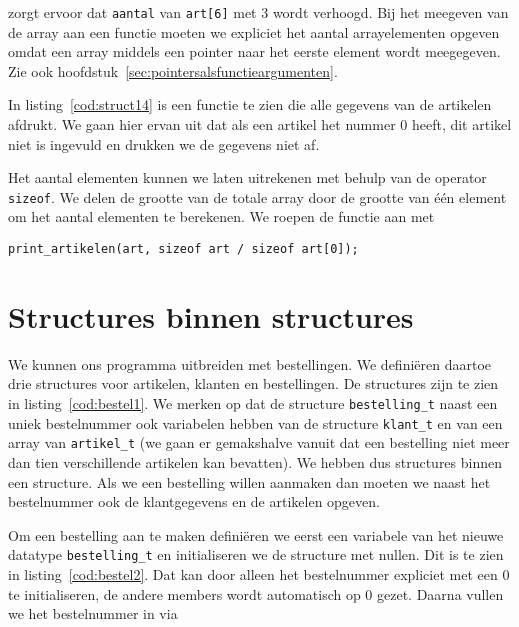 zorgt ervoor dat \texttt{aantal} van \texttt{art[6]} met 3 wordt verhoogd. Bij het meegeven van de array aan een functie moeten we expliciet het aantal arrayelementen opgeven omdat een array middels een pointer naar het eerste element wordt meegegeven. Zie ook hoofdstuk~\ref{sec:pointersalsfunctieargumenten}.

In listing~\ref{cod:struct14} is een functie te zien die alle gegevens van de artikelen afdrukt. We gaan hier ervan uit dat als een artikel het nummer 0 heeft, dit artikel niet is ingevuld en drukken we de gegevens niet af. 


Het aantal elementen kunnen we laten uitrekenen met behulp van de operator \texttt{sizeof}. We delen de grootte van de totale array door de grootte van één element om het aantal elementen te berekenen.
We roepen de functie aan met

\hspace*{1em}\texttt{print\_artikelen(art, sizeof art / sizeof art[0]);}


\section{Structures binnen structures}
We kunnen ons programma uitbreiden met bestellingen. We definiëren daartoe drie structures voor artikelen, klanten en bestellingen. De structures zijn te zien in listing~\ref{cod:bestel1}. We merken op dat de structure \texttt{bestelling\_t} naast een uniek bestelnummer ook variabelen hebben van de structure \texttt{klant\_t} en van een array van \texttt{artikel\_t} (we gaan er gemakshalve vanuit dat een bestelling niet meer dan tien verschillende artikelen kan bevatten). We hebben dus structures binnen een structure. Als we een bestelling willen aanmaken dan moeten we naast het bestelnummer ook de klantgegevens en de artikelen opgeven.


Om een bestelling aan te maken definiëren we eerst een variabele van het nieuwe datatype \texttt{bestelling\_t} en initialiseren we de structure met nullen. Dit is te zien in listing~\ref{cod:bestel2}. Dat kan door alleen het bestelnummer expliciet met een 0 te initialiseren, de andere members wordt automatisch op 0 gezet. Daarna vullen we het bestelnummer in via

